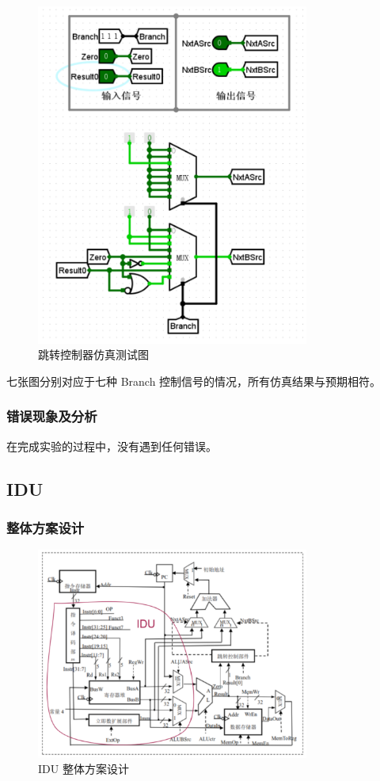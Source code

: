 \documentclass{article}
\begin{document}
    \begin{figure}[H]
        \centering
        \includegraphics[width=0.8\textwidth]{5.5.7.png}   
        \caption{跳转控制器仿真测试图}
    \end{figure}    
    七张图分别对应于七种 Branch 控制信号的情况，所有仿真结果与预期相符。

    \subsubsection{错误现象及分析}
    在完成实验的过程中，没有遇到任何错误。

    \subsection{IDU}
    \subsubsection{整体方案设计}
    \begin{figure}[H]
    \centering
    \includegraphics[width=0.8\textwidth]{6.1.png}
    \caption{IDU 整体方案设计}
    \end{figure}
\end{document}
